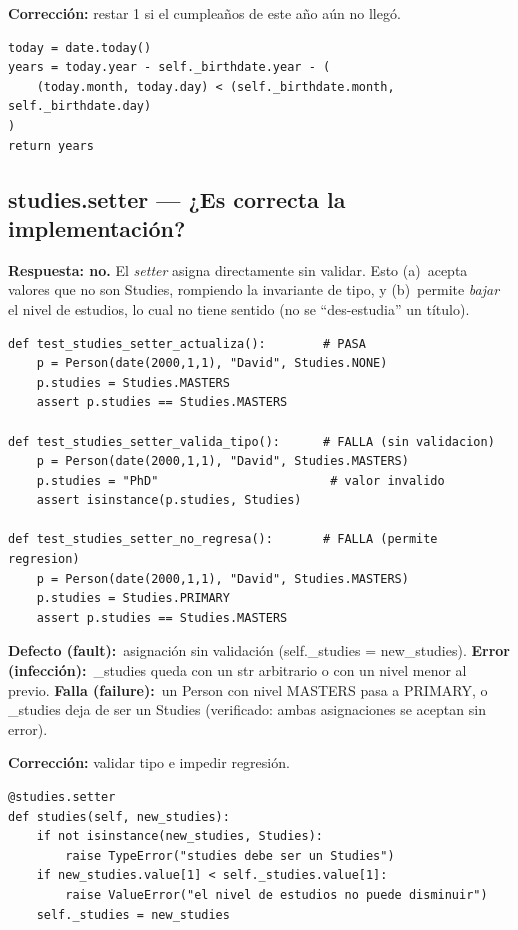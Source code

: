 \documentclass[11pt,a4paper]{article}
\newcommand{\defecto}{\textbf{\textcolor{bad}{Defecto (fault):}}\ }
\newcommand{\error}{\textbf{\textcolor{bad}{Error (infección):}}\ }
\newcommand{\falla}{\textbf{\textcolor{bad}{Falla (failure):}}\ }
\newcommand{\code}[1]{\colorbox{codebg}{\ttfamily\small #1}}
\begin{document}
\begin{answer}\small\textbf{Corrección:} restar 1 si el cumpleaños de este año aún no llegó.
\begin{lstlisting}[style=py]
today = date.today()
years = today.year - self._birthdate.year - (
    (today.month, today.day) < (self._birthdate.month, self._birthdate.day)
)
return years
\end{lstlisting}
\end{answer}

\subsection{\code{studies.setter} --- ¿Es correcta la implementación?}
\begin{answer}
\textbf{Respuesta: no.} El \emph{setter} asigna directamente sin validar. Esto (a)~acepta valores que
no son \code{Studies}, rompiendo la invariante de tipo, y (b)~permite \emph{bajar} el nivel de estudios,
lo cual no tiene sentido (no se ``des-estudia'' un título).
\end{answer}

\begin{lstlisting}[style=py]
def test_studies_setter_actualiza():        # PASA
    p = Person(date(2000,1,1), "David", Studies.NONE)
    p.studies = Studies.MASTERS
    assert p.studies == Studies.MASTERS

def test_studies_setter_valida_tipo():      # FALLA (sin validacion)
    p = Person(date(2000,1,1), "David", Studies.MASTERS)
    p.studies = "PhD"                        # valor invalido
    assert isinstance(p.studies, Studies)

def test_studies_setter_no_regresa():       # FALLA (permite regresion)
    p = Person(date(2000,1,1), "David", Studies.MASTERS)
    p.studies = Studies.PRIMARY
    assert p.studies == Studies.MASTERS
\end{lstlisting}

\begin{def-err-fail}
\defecto asignación sin validación (\code{self.\_studies = new\_studies}).\quad
\error \code{\_studies} queda con un \code{str} arbitrario o con un nivel menor al previo.\quad
\falla un \code{Person} con nivel \code{MASTERS} pasa a \code{PRIMARY}, o \code{\_studies} deja de ser
un \code{Studies} (verificado: ambas asignaciones se aceptan sin error).
\end{def-err-fail}

\begin{answer}\small\textbf{Corrección:} validar tipo e impedir regresión.
\begin{lstlisting}[style=py]
@studies.setter
def studies(self, new_studies):
    if not isinstance(new_studies, Studies):
        raise TypeError("studies debe ser un Studies")
    if new_studies.value[1] < self._studies.value[1]:
        raise ValueError("el nivel de estudios no puede disminuir")
    self._studies = new_studies
\end{lstlisting}
\end{answer}
\end{document}
